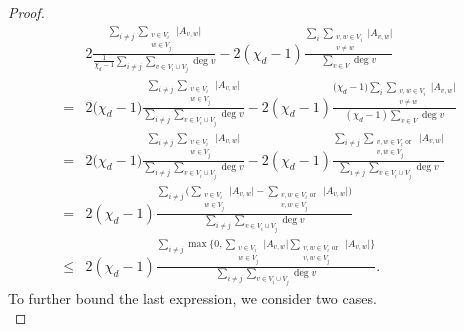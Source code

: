 \documentclass{article}
\theoremstyle{plain}
\theoremstyle{definition}
\theoremstyle{remark}
\begin{document}
\begin{proof}
\begin{align*}
        & 2\frac{\sum_{i\neq j}\sum_{\substack{v\in V_i\\ w\in V_j}}\bigl| A_{v,w}\bigr|}{\frac1{\chi_d-1}\sum_{i\neq j}\sum_{v\in V_i\cup V_j}\deg v} -2(\chi_d-1)\frac{\sum_i\sum_{\substack{v,w\in V_i\\ v\neq w}}\bigl| A_{v,w}\bigr|}{\sum_{v\in V}\deg v} \\
        =& 2\bigl(\chi_d-1\bigr)\frac{\sum_{i\neq j}\sum_{\substack{v\in V_i\\ w\in V_j}}\bigl| A_{v,w}\bigr|}{\sum_{i\neq j}\sum_{v\in V_i\cup V_j}\deg v} -2(\chi_d-1)\frac{\bigl(\chi_d-1\bigr)\sum_i\sum_{\substack{v,w\in V_i\\ v\neq w}}\bigl| A_{v,w}\bigr|}{(\chi_d-1)\sum_{v\in V}\deg v} \\
        =& 2\bigl(\chi_d-1\bigr)\frac{\sum_{i\neq j}\sum_{\substack{v\in V_i\\ w\in V_j}}\bigl| A_{v,w}\bigr|}{\sum_{i\neq j}\sum_{v\in V_i\cup V_j}\deg v} -2(\chi_d-1)\frac{\sum_{i\neq j}\sum_{\substack{v,w\in V_i \text{ or }\\ v,w\in V_j}}\bigl| A_{v,w}\bigr|}{\sum_{i\neq j}\sum_{v\in V_i\cup V_j}\deg v}\\
        =& 2(\chi_d-1) \frac{\sum_{i\neq j}\biggl(\sum_{\substack{v\in V_i\\w\in V_j}}\bigl| A_{v,w}\bigr| - \sum_{\substack{v,w\in V_i \text{ or }\\ v,w\in V_j}}\bigl| A_{v,w}\bigr|\biggr)}{\sum_{i\neq j}\sum_{v\in V_i\cup V_j}\deg v}\\
        \leq& 2(\chi_d-1) \frac{\sum_{i\neq j}\max\biggl\{0,\sum_{\substack{v\in V_i\\w\in V_j}}\bigl| A_{v,w}\bigr| \sum_{\substack{v,w\in V_i \text{ or }\\ v,w\in V_j}}\bigl| A_{v,w}\bigr|\biggr\}}{\sum_{i\neq j}\sum_{v\in V_i\cup V_j}\deg v}.
    \end{align*}
    To  further bound the last expression, we consider two cases. \\


\end{proof}
\end{document}
